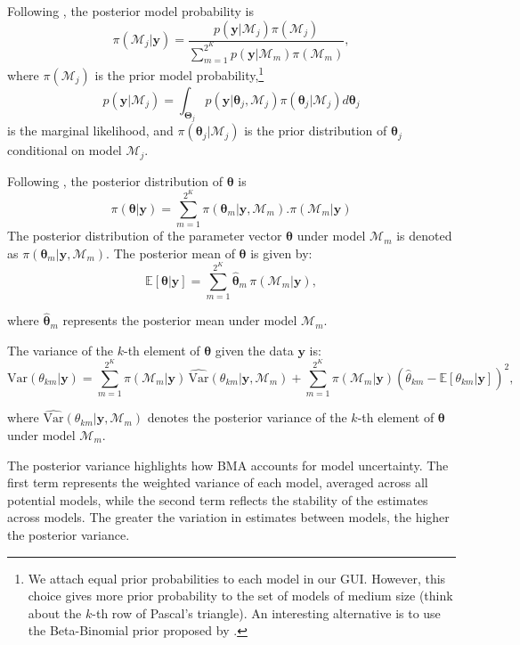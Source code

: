 Following \cite{Simmons2010}, the posterior model probability is
\begin{equation*}
	\pi(\mathcal{M}_j |\bm{y})=\frac{p(\bm{y} | \mathcal{M}_j)\pi(\mathcal{M}_j)}{\sum_{m=1}^{2^K}p(\bm{y} | \mathcal{M}_m)\pi(\mathcal{M}_m)},
\end{equation*}
where $\pi(\mathcal{M}_j)$ is the prior model probability,\footnote{We attach equal prior probabilities to each model in our GUI. However, this choice gives more prior probability to the set of models of medium size (think about the $k$-th row of Pascal's triangle). An interesting alternative is to use the Beta-Binomial prior proposed by \cite{ley2009effect}.} 
\begin{equation*}
	p(\bm{y} | \mathcal{M}_j)=\int_{\bm{\Theta}_j} p(\bm{y}| \bm{\theta}_j,\mathcal{M}_j)\pi(\bm{\theta}_j | \mathcal{M}_j) d\bm{\theta}_{j}
\end{equation*}
is the marginal likelihood, and $\pi(\bm{\theta}_j | \mathcal{M}_j)$ is the prior distribution of $\bm{\theta}_j$ conditional on model $\mathcal{M}_j$.

Following \cite{Raftery93}, the posterior distribution of $\bm{\theta}$ is 
\begin{equation*}
	\pi(\bm{\theta}|\bm{y})= \sum_{m=1}^{2^K}\pi(\bm{\theta}_m|\bm{y},\mathcal{M}_m). \pi(\mathcal{M}_m|\bm{y})
\end{equation*}
The posterior distribution of the parameter vector \(\bm{\theta}\) under model \(\mathcal{M}_m\) is denoted as \(\pi(\bm{\theta}_m|\bm{y}, \mathcal{M}_m)\). The posterior mean of \(\bm{\theta}\) is given by:
\[
\mathbb{E}[\bm{\theta}|\bm{y}] = \sum_{m=1}^{2^K} \hat{\bm{\theta}}_m \, \pi(\mathcal{M}_m|\bm{y}),
\]

where \(\hat{\bm{\theta}}_m\) represents the posterior mean under model \(\mathcal{M}_m\).

The variance of the \(k\)-th element of \(\bm{\theta}\) given the data \(\bm{y}\) is:
\[
\text{Var}(\theta_{km}|\bm{y}) = \sum_{m=1}^{2^K} \pi(\mathcal{M}_m|\bm{y}) \, \widehat{\text{Var}}(\theta_{km}|\bm{y}, \mathcal{M}_m) + \sum_{m=1}^{2^K} \pi(\mathcal{M}_m|\bm{y}) \left( \hat{\theta}_{km} - \mathbb{E}[\theta_{km}|\bm{y}] \right)^2,
\]

where \(\widehat{\text{Var}}(\theta_{km}|\bm{y}, \mathcal{M}_m)\) denotes the posterior variance of the \(k\)-th element of \(\bm{\theta}\) under model \(\mathcal{M}_m\).

The posterior variance highlights how BMA accounts for model uncertainty. The first term represents the weighted variance of each model, averaged across all potential models, while the second term reflects the stability of the estimates across models. The greater the variation in estimates between models, the higher the posterior variance.

